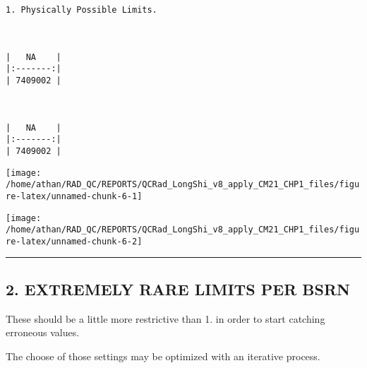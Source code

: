 \documentclass[
  10pt,
  a4paper,oneside]{article}
\newenvironment{Shaded}{\begin{snugshade}}{\end{snugshade}}
\newcommand{\DataTypeTok}[1]{\textcolor[rgb]{0.13,0.29,0.53}{#1}}
\newcommand{\DecValTok}[1]{\textcolor[rgb]{0.00,0.00,0.81}{#1}}
\newcommand{\KeywordTok}[1]{\textcolor[rgb]{0.13,0.29,0.53}{\textbf{#1}}}
\newcommand{\NormalTok}[1]{#1}
\newcommand{\OperatorTok}[1]{\textcolor[rgb]{0.81,0.36,0.00}{\textbf{#1}}}
\newcommand{\OtherTok}[1]{\textcolor[rgb]{0.56,0.35,0.01}{#1}}
\begin{document}
\begin{Shaded}
\end{Shaded}

\begin{verbatim}
1. Physically Possible Limits.



|   NA    |
|:-------:|
| 7409002 |



|   NA    |
|:-------:|
| 7409002 |
\end{verbatim}

\begin{center}\texttt{[image: /home/athan/RAD\_QC/REPORTS/QCRad\_LongShi\_v8\_apply\_CM21\_CHP1\_files/figure-latex/unnamed-chunk-6-1]} \end{center}

\begin{center}\texttt{[image: /home/athan/RAD\_QC/REPORTS/QCRad\_LongShi\_v8\_apply\_CM21\_CHP1\_files/figure-latex/unnamed-chunk-6-2]} \end{center}

\begin{center}\rule{0.5\linewidth}{0.5pt}\end{center}

\newpage

\hypertarget{extremely-rare-limits-per-bsrn}{%
\subsection{2. EXTREMELY RARE LIMITS PER BSRN}\label{extremely-rare-limits-per-bsrn}}

These should be a little more restrictive than 1. in order to start
catching erroneous values.

The choose of those settings may be optimized with an iterative process.
\end{document}
